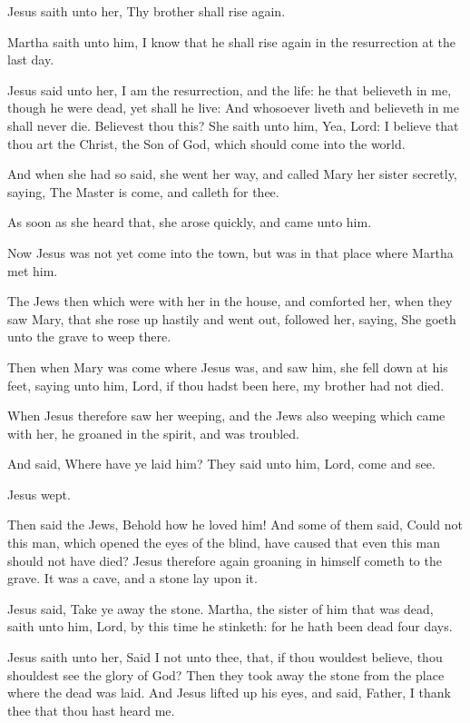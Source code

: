 \Verse Jesus saith unto her, Thy brother shall rise again.

\Verse Martha saith unto him, I know that he shall rise again in the resurrection at the last day.

\Verse Jesus said unto her, I am the resurrection, and the life: he that believeth in me, though he were dead, yet shall he live: \Verse And whosoever liveth and believeth in me shall never die. Believest thou this?  \Verse She saith unto him, Yea, Lord: I believe that thou art the Christ, the Son of God, which should come into the world.

\Verse And when she had so said, she went her way, and called Mary her sister secretly, saying, The Master is come, and calleth for thee.

\Verse As soon as she heard that, she arose quickly, and came unto him.

\Verse Now Jesus was not yet come into the town, but was in that place where Martha met him.

\Verse The Jews then which were with her in the house, and comforted her, when they saw Mary, that she rose up hastily and went out, followed her, saying, She goeth unto the grave to weep there.

\Verse Then when Mary was come where Jesus was, and saw him, she fell down at his feet, saying unto him, Lord, if thou hadst been here, my brother had not died.

\Verse When Jesus therefore saw her weeping, and the Jews also weeping which came with her, he groaned in the spirit, and was troubled.

\Verse And said, Where have ye laid him? They said unto him, Lord, come and see.

\Verse Jesus wept.

\Verse Then said the Jews, Behold how he loved him!  \Verse And some of them said, Could not this man, which opened the eyes of the blind, have caused that even this man should not have died?  \Verse Jesus therefore again groaning in himself cometh to the grave. It was a cave, and a stone lay upon it.

\Verse Jesus said, Take ye away the stone. Martha, the sister of him that was dead, saith unto him, Lord, by this time he stinketh: for he hath been dead four days.

\Verse Jesus saith unto her, Said I not unto thee, that, if thou wouldest believe, thou shouldest see the glory of God?  \Verse Then they took away the stone from the place where the dead was laid. And Jesus lifted up his eyes, and said, Father, I thank thee that thou hast heard me.

